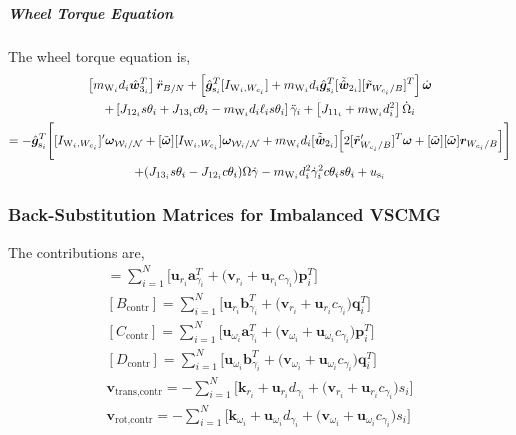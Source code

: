 \subparagraph{Wheel Torque Equation}

 The wheel torque equation is,
\begin{multline}
\left[ m_{\text{W}_i}d_i\hat{\bm w}_{3_i}^T \right] \ddot{\bm r}_{B/N} + \left[ \hat{\bm g}_{\text{s}_i}^T[I_{\text{W}_i,W_{c_i}}] + m_{\text{W}_i}d_i\hat{\bm g}_{\text{s}_i}^T[\tilde{\hat{\bm w}}_{2_i}][\tilde{\bm{r}}_{W_{c_i}/B}]^T \right] \dot{\bm\omega}
\\
+\left[ J_{12_i}s\theta_i + J_{13_i}c\theta_i - m_{\text{W}_i}d_i\ell_is\theta_i \right] \ddot{\gamma}_i 
+ \left[ J_{11_i}  + m_{\text{W}_i}d_i^2 \right] \dot{\Omega}_i
\\
=-\hat{\bm g}_{\text{s}_i}^T \Bigg[ [I_{\text{W}_i,W_{c_i}}]'\bm\omega_{\mathcal{W}_i/\cal N} + [\tilde{\bm{\omega}}][I_{\text{W}_i,W_{c_i}}]\bm\omega_{\mathcal{W}_i/\cal N}  + m_{\text{W}_i}d_i[\tilde{\hat{\bm w}}_{2_i}] \Big[ 2[\tilde{\bm{r}}'_{W_{c_i}/B}]^T\bm\omega + [\tilde{\bm\omega}][\tilde{\bm\omega}]\bm{r}_{W_{c_i}/B}
\Big] \Bigg] \\+(J_{13_i}s\theta_i - J_{12_i}c\theta_i)\Omega\dot{\gamma} - m_{\text{W}_i}d_i^2\dot{\gamma}_i^2c\theta_is\theta_i
+ u_{\text{s}_i}
\end{multline}  

\subsubsection{Back-Substitution Matrices for Imbalanced VSCMG}


The contributions are,
\begin{gather}
[A_\text{contr}] =  \sum\limits_{i=1}^{N}\Big[\bm{u}_{r_i}\bm{a}_{\gamma_i}^T + \big(\bm{v}_{r_i} + \bm{u}_{r_i}c_{\gamma_i}\big)\bm{p}_i^T\Big]
\\
[B_\text{contr}] =  \sum\limits_{i=1}^{N}\Big[\bm{u}_{r_i}\bm{b}_{\gamma_i}^T + \big(\bm{v}_{r_i} + \bm{u}_{r_i}c_{\gamma_i}\big)\bm{q}_i^T\Big]
\\
[C_\text{contr}] = \sum\limits_{i=1}^{N}\Big[\bm{u}_{\omega_i}\bm{a}_{\gamma_i}^T + \big(\bm{v}_{\omega_i} + \bm{u}_{\omega_i}c_{\gamma_i}\big)\bm{p}_i^T\Big]
\\
[D_\text{contr}] = \sum\limits_{i=1}^{N}\Big[\bm{u}_{\omega_i}\bm{b}_{\gamma_i}^T + \big(\bm{v}_{\omega_i} + \bm{u}_{\omega_i}c_{\gamma_i}\big)\bm{q}_i^T\Big]
\\
\bm{v}_\text{trans,contr} =  -  \sum\limits_{i=1}^{N}\Big[\bm{k}_{r_i}+\bm{u}_{r_i}d_{\gamma_i} + \big(\bm{v}_{r_i} + \bm{u}_{r_i}c_{\gamma_i}\big)s_i\Big]
\\
\bm{v}_\text{rot,contr} = -  \sum\limits_{i=1}^{N}\Big[\bm{k}_{\omega_i} +\bm{u}_{\omega_i}d_{\gamma_i}+ \big(\bm{v}_{\omega_i} + \bm{u}_{\omega_i}c_{\gamma_i}\big)s_i\Big]
\end{gather}



